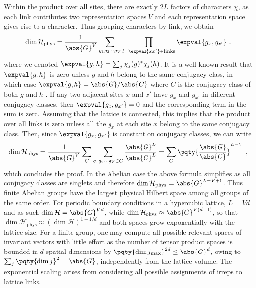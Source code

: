 Within the product over all sites, there are exactly $2L$ factors of characters $\chi$, as each link contributes two representation spaces $V$ and each representation space gives rise to a character.
Thus grouping characters by link, we obtain
\begin{equation}
    \dim{\mathcal{H}_{\mathrm{phys}}} =\frac{1}{\abs{G}^V} \sum_{g_1 g_2 \cdots g_V} \prod_{l = \expval{xx'} \in \mathrm{links}} \expval{g_x, g_{x'}} \ .
\end{equation}
where we denoted $\expval{g, h} = \sum_j \chi_j(g)^* \chi_j(h)$.
It is a well-known result that $\expval{g, h}$ is zero unless $g$ and $h$ belong to the same conjugacy class, in which case $\expval{g, h} = \abs{G} / \abs{C}$ where $C$ is the conjugacy class of both $g$ and $h$ \cite{serre1967representations}.
If any two adjacent sites $x$ and $x'$ have $g_x$ and $g_{x'}$ in different conjugacy classes, then $\expval{g_x, g_{x'}}=0$ and the corresponding term in the sum is zero.
Assuming that the lattice is connected, this implies that the product over all links is zero unless all the $g_x$ at each site $x$ belong to the same conjugacy class.
Then, since $\expval{g_x, g_{x'}}$ is constant on conjugacy classes, we can write
\begin{equation}
    \dim{\mathcal{H}_{\mathrm{phys}}}
    =\frac{1}{\abs{G}^V} \sum_C \sum_{g_1 g_2 \cdots g_V \in C} \frac{\abs{G}^L}{\abs{C}^L} = \sum_C  \pqty{\frac{\abs{G}}{\abs{C}}}^{L-V} \ ,
\end{equation}
which concludes the proof.
In the Abelian case the above formula simplifies as all conjugacy classes are singlets and therefore $\dim{\mathcal{H}_{\mathrm{phys}}} = \abs{G}^{L-V+1}$.
Thus finite Abelian groups have the largest physical Hilbert space among all groups of the same order.
For periodic boundary conditions in a hypercubic lattice, $L=Vd$ and as such $\dim{\mathcal{H}}=\abs{G}^{Vd}$, while $\dim{\mathcal{H}_{\mathrm{phys}}} \approx \abs{G}^{V (d-1)}$, so that $\dim{\mathcal{H}_{\mathrm{phys}}} \approx (\dim{\mathcal{H}})^{1-1/d}$ and both spaces grow exponentially with the lattice size.
For a finite group, one may compute all possible relevant spaces of invariant vectors with little effort as the number of tensor product spaces is bounded in $d$ spatial dimensions by $\pqty{\dim{j}_\mathrm{max}}^{2d} \leq \abs{G}^d$, owing to $\sum_j \pqty{\dim{j}}^2 = \abs{G}$, independently from the lattice volume.
The exponential scaling arises from considering all possible assignments of irreps to lattice links.

